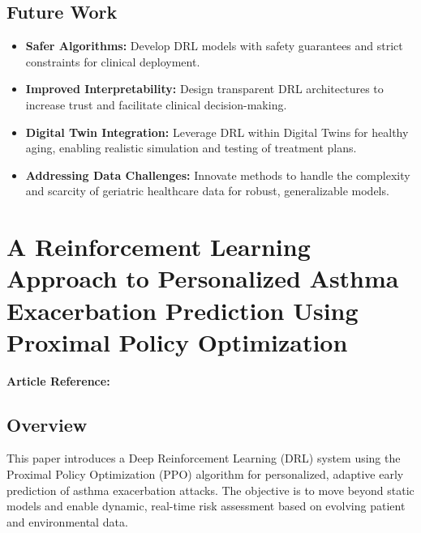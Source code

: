 \subsection*{Future Work}
\begin{itemize}
    \item \textbf{Safer Algorithms:} Develop DRL models with safety guarantees and strict constraints for clinical deployment.
    \item \textbf{Improved Interpretability:} Design transparent DRL architectures to increase trust and facilitate clinical decision-making.
    \item \textbf{Digital Twin Integration:} Leverage DRL within Digital Twins for healthy aging, enabling realistic simulation and testing of treatment plans.
    \item \textbf{Addressing Data Challenges:} Innovate methods to handle the complexity and scarcity of geriatric healthcare data for robust, generalizable models.
\end{itemize}

\section{A Reinforcement Learning Approach to Personalized Asthma Exacerbation Prediction Using Proximal Policy Optimization}
\textbf{Article Reference:} \cite{aliyuReinforcementLearningApproach2025}

\subsection*{Overview}
This paper introduces a Deep Reinforcement Learning (DRL) system using the Proximal Policy Optimization (PPO) algorithm for personalized, adaptive early prediction of asthma exacerbation attacks. The objective is to move beyond static models and enable dynamic, real-time risk assessment based on evolving patient and environmental data.


